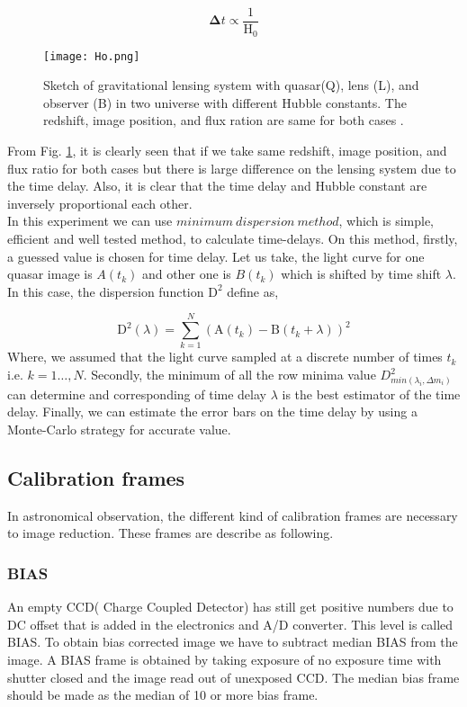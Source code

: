 \begin{equation}
\pmb\Delta t \propto \frac{1}{\text{H}_{0}}
\end{equation}
\begin{figure}[H]
	\centering
	\texttt{[image: Ho.png]}
	\caption{Sketch of gravitational lensing system with quasar(Q), lens (L), and observer (B) in two universe with different Hubble constants. The redshift, image position, and flux ration are same for both cases \cite{manual}.}%
	\label{Fig:H_{0}}
	
\end{figure}
\noindent
From Fig. \ref{Fig:H_{0}}, it is clearly seen that if we take same redshift, image position, and flux ratio for both cases but there is large difference on the lensing system due to the time delay. Also, it is clear that the time delay and Hubble constant are inversely proportional each other.  \\

\noindent
In this experiment we can use $ minimum ~dispersion ~method $, which is simple, efficient and well tested method, to calculate time-delays. On this method, firstly, a guessed value is chosen for time delay. Let us take, the light curve for one quasar image is $ A(t_{k}) $ and other one is $ B(t_{k}) $ which is shifted by time shift $ \lambda $. In this case, the dispersion function $ \text{D}^2 $ define as,

\begin{equation}
\text{D}^2(\lambda)=\sum_{k=1}^{N}(\text{A}(t_{k}) - \text{B}(t_{k}+\lambda) )^2
\end{equation}
Where, we assumed that the light curve sampled at a discrete number of times $ t_{k}$ i.e. $ k=1 \dots, N $.
Secondly, the minimum of all the row minima value $ D^2_{min(\lambda_i, \Delta m_{i})} $ can determine and corresponding of time delay $ \lambda $ is the best estimator of the time delay.
Finally, we can estimate the error bars on the time delay by using a Monte-Carlo strategy for accurate  value.




\subsection{Calibration frames}
In astronomical observation, the different kind of calibration frames are necessary to image reduction. These frames are describe as following.

\subsubsection{BIAS}
An empty CCD( Charge Coupled Detector) has still get positive numbers due to DC offset that is added in the electronics and A/D converter. This level is called BIAS. To obtain bias corrected image we have to subtract median BIAS from the image. A BIAS frame is obtained by taking exposure of no exposure time with shutter closed and the image read out of unexposed CCD. The median bias frame should be made as the median of  10 or more bias frame.
